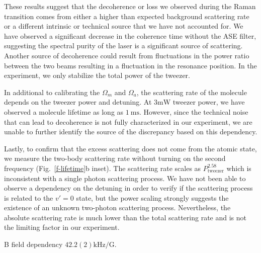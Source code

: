 \documentclass[aps,prl,twocolumn,superscriptaddress]{revtex4-1}
\newcommand{\todo}[1]{}
\begin{document}
\todo{change scattering to decoherence? since the fluctuation of light shift
  does not lead to scattering but only decherence.}
These results suggest that the decoherence or loss we observed during the Raman transition
comes from either a higher than expected background scattering rate
or a different intrinsic or technical source that we have not accounted for.
We have observed a significant decrease in the coherence time without the ASE filter,
suggesting the spectral purity of the laser is a significant source of scattering.
Another source of decoherence could result from fluctuations in the power ratio
between the two beams resulting in a fluctuation in the resonance position.
In the experiment, we only stabilize the total power of the tweezer.

In additional to calibrating the $\Omega_m$ and $\Omega_a$,
the scattering rate of the molecule depends on the tweezer power and detuning.
At $3\mathrm{mW}$ tweezer power, we have observed a molecule lifetime as long as $1~\mathrm{ms}$.
However, since the technical noise that can lead to decoherence
is not fully characterized in our experiment,
we are unable to further identify the source of the discrepancy based on this dependency.

Lastly, to confirm that the excess scattering does not come from the atomic state,
we measure the two-body scattering rate
without turning on the second frequency (Fig.~\ref{f-lifetime}b inset).
The scattering rate scales as $P_{\mathrm{tweezer}}^{2.58}$ which is inconsistent
with a single photon scattering process.
We have not been able to observe a dependency on the detuning in order to verify
if the scattering process is related to the $v'=0$ state,
but the power scaling strongly suggests the existence of an unknown two-photon scattering process.
Nevertheless, the absolute scattering rate is much lower than the total scattering rate
and is not the limiting factor in our experiment.

\todo{}B field dependency $42.2(2) \mathrm{kHz/G}$.
\end{document}
